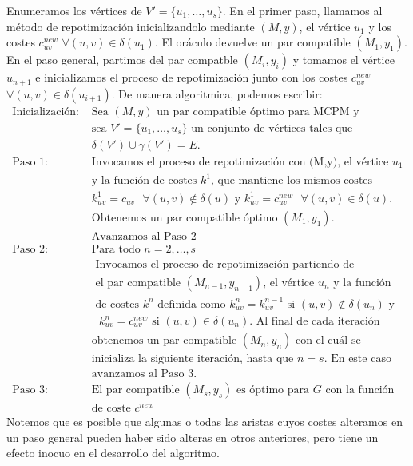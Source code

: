 \documentclass[twoside,a4paper,openright,12pt]{book}
\begin{document}
Enumeramos los vértices de $V' = \{u_1,\dotsc,u_s\}$. En el primer paso, llamamos al método de repotimización inicializandolo mediante $(M,y)$, el vértice $u_1$ y los costes $c_{uv}^{new}$ $\forall (u,v) \in \delta(u_1)$. El oráculo devuelve un par compatible $(M_1,y_1)$. En el paso general, partimos del par compatble $(M_i,y_i)$ y tomamos el vértice $u_{n+1}$ e inicializamos el proceso de repotimización junto con los costes $c_{uv}^{new}$ $\forall (u,v) \in \delta(u_{i+1})$. 
De manera algoritmica, podemos escribir:
\begin{align*}
\text{Inicialización: }& \text{Sea $(M,y)$ un par compatible óptimo para MCPM y}\\
& \text{sea $V'=\{u_1,\dotsc,u_s\}$ un conjunto de vértices tales que }\\
& \text{$\delta(V')\cup\gamma(V')=E$.}\\
\text{Paso 1: }& \text{Invocamos el proceso de repotimización con (M,y), el vértice $u_1$}\\
&\text{y la función de costes $k^1$, que mantiene los mismos costes}\\
&\text{$k^1_{uv} = c_{uv}$ $\forall (u,v)\notin \delta(u)$ y $k^1_{uv}=c^{new}_{uv}$ $\forall(u,v) \in \delta(u)$.}\\
&\text{Obtenemos un par compatible óptimo $(M_1,y_1)$.}\\
&\text{Avanzamos al Paso 2}\\
\text{Paso 2: }& \text{Para todo $n =2,\dotsc,s$}\\
&\text{		Invocamos el proceso de repotimización partiendo de}\\
&\text{		el par compatible $(M_{n-1},y_{n-1})$, el vértice $u_n$ y la función}\\
&\text{		de costes $k^n$ definida como $k^n_{uv} =k^{n-1}_{uv}$ si $(u,v)\notin \delta(u_n)$ y}\\
&\text{		$k^n_{uv}=c^{new}_{uv}$ si $(u,v)\in \delta(u_n)$. Al final de cada iteración }\\
&\text{obtenemos un par compatible $(M_n,y_n)$ con el cuál se}\\
&\text{inicializa la siguiente iteración, hasta que $n=s$. En este caso}\\
&\text{avanzamos al Paso 3.}\\
\text{Paso 3: }&\text{El par compatible $(M_s,y_s)$ es óptimo para $G$ con la función}\\
&\text{de coste $c^{new}$}
\end{align*}
Notemos que es posible que algunas o todas las aristas cuyos costes alteramos en un paso general pueden haber sido alteras en otros anteriores, pero tiene un efecto inocuo en el desarrollo del algoritmo. 
\end{document}

